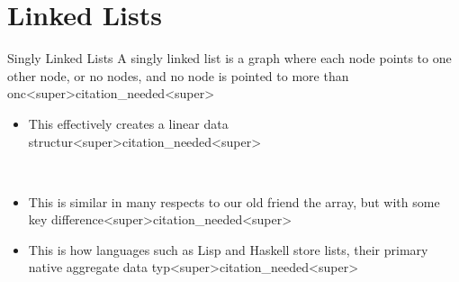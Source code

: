\documentclass[11pt]{beamer}
\begin{document}






\section[Linked Lists]{Linked Lists}
\begin{frame}{Singly Linked Lists}
A singly linked list is a graph where each node points to one other node, or no nodes, and no node is pointed to more than onc<super>citation_needed<super>  
\begin{itemize}
\item This effectively creates a linear data structur<super>citation_needed<super>
\end{itemize}
\center
\
\flushright
\begin{itemize}
\item This is similar in many respects to our old friend the array, but with some key difference<super>citation_needed<super>  
\item This is how languages such as Lisp and Haskell store lists, their primary native aggregate data typ<super>citation_needed<super> 
\end{itemize}
\end{frame}
\end{document}
